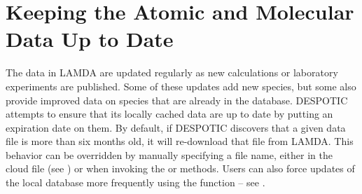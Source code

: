 \documentclass[letterpaper,10pt,english]{sphinxmanual}
\begin{document}
\section{Keeping the Atomic and Molecular Data Up to Date}
\label{data:keeping-the-atomic-and-molecular-data-up-to-date}\label{data:ssec-database-updates}
The data in LAMDA are updated regularly as new calculations or
laboratory experiments are published. Some of these updates add new
species, but some also provide improved data on species that are
already in the database. DESPOTIC attempts to ensure that its locally
cached data are up to date by putting an expiration date on them. By
default, if DESPOTIC discovers that a given data file is more than six
months old, it will re-download that file from LAMDA. This behavior
can be overridden by manually specifying a file name, either in the
cloud file (see {\hyperref[cloudfiles:sec\string-cloudfiles]{}}) or when invoking
the  or  methods. Users
can also force updates of the local database more frequently using the
 function -- see {\hyperref[fulldoc:sssec\string-full\string-refreshlamda]{}}.
\end{document}
